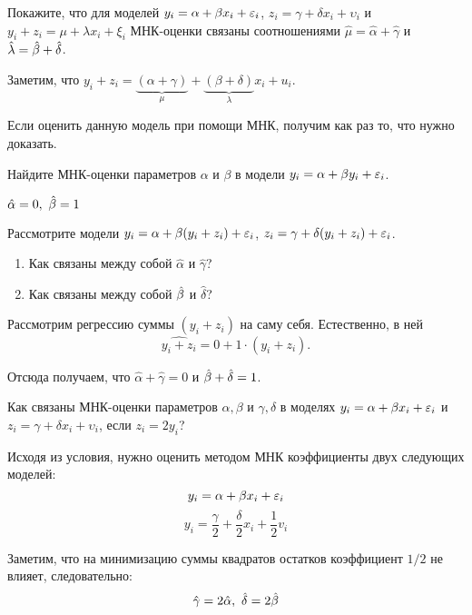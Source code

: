 \begin{problem} %
Покажите, что для моделей $y_i= \alpha + \beta x_i + \varepsilon_i$, $z_i = \gamma + \delta x_i + \upsilon_i$ и $y_i + z_i = \mu + \lambda x_i + \xi_i$ МНК-оценки связаны соотношениями $\hat{\mu}=\hat{\alpha}+\hat{\gamma}$ и $\hat{\lambda}=\hat{\beta} + \hat{\delta}$.


\begin{sol}
Заметим, что $y_i + z_i = \underbrace{(\alpha + \gamma)}_{\mu} + \underbrace{(\beta+\delta)}_{\lambda}x_i + u_i$.

Если оценить данную модель при помощи МНК, получим как раз то, что нужно доказать.
\end{sol}
\end{problem}


\begin{problem} %
Найдите МНК-оценки параметров $\alpha$ и $\beta$ в модели $y_i = \alpha + \beta y_i + \varepsilon_i$.


\begin{sol}
\(\hat{\alpha} = 0, \ \hat{\beta} = 1 \)
\end{sol}
\end{problem}


\begin{problem} %
Рассмотрите модели $y_i = \alpha + \beta (y_i + z_i) + \varepsilon_i$, $z_i = \gamma + \delta(y_i+z_i) + \varepsilon_i$.
\begin{enumerate}
\item Как связаны между собой $\hat{\alpha}$ и $\hat{\gamma}$?
\item Как связаны между собой $\hat{\beta}$ и $\hat{\delta}$?
\end{enumerate}


\begin{sol} %
Рассмотрим регрессию суммы $(y_i + z_i)$ на саму себя. Естественно, в ней
\[
\widehat{y_i + z_i} = 0 + 1 \cdot (y_i + z_i).
\]

Отсюда получаем, что $\hat{\alpha} + \hat{\gamma} = 0$ и $\hat{\beta} + \hat{\delta} = 1$.
\end{sol}
\end{problem}




\begin{problem} %
Как связаны МНК-оценки параметров $\alpha, \beta$ и $\gamma, \delta$ в моделях $y_i = \alpha + \beta x_i + \varepsilon_i$ и $z_i = \gamma + \delta x_i + \upsilon_i$, если $z_i = 2 y_i$?


\begin{sol}

Исходя из условия, нужно оценить методом МНК коэффициенты двух следующих моделей:
\[y_i = \alpha + \beta x_i + \varepsilon_i \]
\[y_i = \frac{\gamma}{2} + \frac{\delta}{2} x_i + \frac{1}{2} v_i \]

Заметим, что на минимизацию суммы квадратов остатков коэффициент \(1/2\) не влияет, следовательно:
\[\hat{\gamma} = 2\hat{\alpha}, \ \hat{\delta} = 2 \hat{\beta}  \]

\end{sol}
\end{problem}


